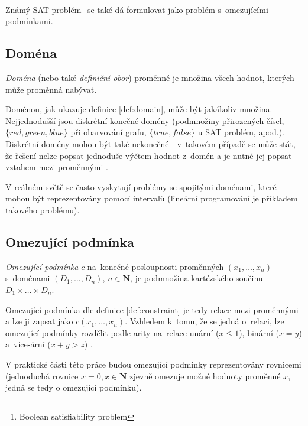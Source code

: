 Známý SAT problém\footnote{Boolean satisfiability problem} se také dá formulovat jako problém s~omezujícími podmínkami.

\subsection{Doména}
\begin{definition}[{\cite[s.~10]{Vu2005}}]
\label{def:domain}
\emph{Doména} (nebo také \emph{definiční obor}) proměnné je množina všech hodnot, kterých může proměnná nabývat.
\end{definition}

Doménou, jak ukazuje definice \ref{def:domain}, může být jakákoliv množina. Nejjednodušší jsou diskrétní konečné domény (podmnožiny přirozených čísel,\\ $\{red, green, blue \}$ při obarvování grafu, $\{ true, false \}$ u SAT problém, apod.). Diskrétní domény mohou být také nekonečné - v~takovém případě se může stát, že řešení nelze popsat jednoduše výčtem hodnot z~domén a je nutné jej popsat vztahem mezi proměnnými \cite[s.~139]{Russell:2003}.

V reálném světě se často vyskytují problémy se spojitými doménami, které mohou být reprezentovány pomocí intervalů (lineární programování je příkladem takového problému).


\subsection{Omezující podmínka}
\begin{definition}[{\cite[s.~11]{Vu2005}}]
\label{def:constraint}
\emph{Omezující podmínka} $c$ na~konečné posloupnosti proměnných $(x_1, \dots, x_n)$ s~doménami $(D_1, \dots, D_n)$, $n \in \boldsymbol{N}$, je podmnožina kartézského součinu $ D_1 \times \dots \times D_n $.
\end{definition}

Omezující podmínka dle definice \ref{def:constraint} je tedy relace mezi proměnnými a lze ji zapsat jako $c(x_1, \dots, x_n)$. Vzhledem k~tomu, že se jedná o~relaci, lze omezující podmínky rozdělit podle arity na~relace unární ($x \leq 1$), binární ($x = y$) a~více-ární ($x + y > z $) \cite[s.~139]{Russell:2003}.

V praktické části této práce budou omezující podmínky reprezentovány rovnicemi (jednoduchá rovnice $x = 0, x \in \boldsymbol{N}$ zjevně omezuje možné hodnoty proměnné $x$, jedná se tedy o omezující podmínku).

